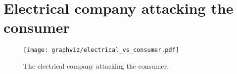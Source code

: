 \section{Electrical company attacking the consumer}


\begin{figure}
  \begin{center}
    \texttt{[image: graphviz/electrical\_vs\_consumer.pdf]}
  \end{center}
  \caption{The electrical company attacking the consumer.}
  \label{electrical_vs_consumer}
\end{figure}